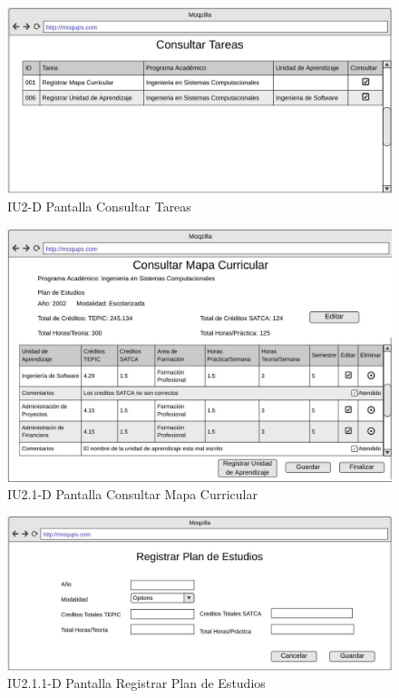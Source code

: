 
\begin{figure}
    \centering
    \includegraphics[width=0.75\linewidth]{DCU/SP4/IU/Images/Docente/2-ConsultarTareas-D}
    \caption{IU2-D Pantalla Consultar Tareas}
    \label{IU2-D}
\end{figure}

\begin{figure}
	\centering
	\includegraphics[width=0.75\linewidth]{DCU/SP4/IU/Images/Docente/2-1-ConsultarMapaCurricular-D}
	\caption{IU2.1-D Pantalla Consultar Mapa Curricular}
	\label{IU2.1-D}
\end{figure}

\begin{figure}
	\centering
	\includegraphics[width=0.75\linewidth]{DCU/SP4/IU/Images/Docente/2-1-1-RegistrarPlanDeEstudios-D}
	\caption{IU2.1.1-D Pantalla Registrar Plan de Estudios}
	\label{IU2.1.1-D}
\end{figure}

